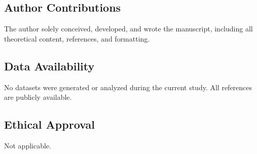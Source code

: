 \documentclass[preprints,article,submit,pdftex,moreauthors]{Definitions/mdpi}
\begin{document}
\subsection*{Author Contributions}  
The author solely conceived, developed, and wrote the manuscript, including all theoretical content, references, and formatting.

\subsection*{Data Availability}  
No datasets were generated or analyzed during the current study. All references are publicly available.

\subsection*{Ethical Approval}  
Not applicable.



\end{document}
